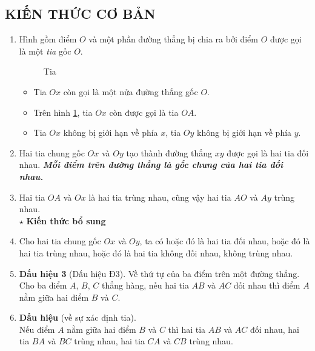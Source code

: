 \subsection{KIẾN THỨC CƠ BẢN}
\begin{enumerate}
	\item Hình gồm điểm $O$ và một phần đường thẳng bị chia ra bởi điểm $O$ được gọi là một \emph{tia} gốc $O$.
	\begin{figure}[h]
		\centering
		\caption{Tia}
		\label{01.thai.im1}
	\end{figure}
	
	\begin{itemize}
		\item Tia $Ox$ còn gọi là một nửa đường thẳng gốc $O$.
		\item Trên hình \ref{01.thai.im1}, tia $Ox$ còn được gọi là tia $OA$.
		\item Tia $Ox$ không bị giới hạn về phía $x$, tia $Oy$ không bị giới hạn về phía $y$.
	\end{itemize}
	\item Hai tia chung gốc $Ox$ và $Oy$ tạo thành đường thẳng $xy$ được gọi là hai tia đối nhau. \emph{\textbf{Mỗi điểm trên đường thẳng là gốc chung của hai tia đối nhau.}}
	\item Hai tia $OA$ và $Ox$ là hai tia trùng nhau, cũng vậy hai tia $AO$ và $Ay$ trùng nhau.\\
	$\star$ \textbf{Kiến thức bổ sung}
	\item Cho hai tia chung gốc $Ox$ và $Oy$, ta có hoặc đó là hai tia đối nhau, hoặc đó là hai tia trùng nhau, hoặc đó là hai tia không đối nhau, không trùng nhau.
	\item \textbf{Dấu hiệu 3} (Dấu hiệu Đ3). Về thứ tự của ba điểm trên một đường thẳng.\\
	Cho ba điểm $A$, $B$, $C$ thẳng hàng, nếu hai tia $AB$ và $AC$ đối nhau thì điểm $A$ nằm giữa hai điểm $B$ và $C$.
	\item \textbf{Dấu hiệu} (về sự xác định tia).\\
	Nếu điểm $A$ nằm giữa hai điểm $B$ và $C$ thì hai tia $AB$ và $AC$ đối nhau, hai tia $BA$ và $BC$ trùng nhau, hai tia $CA$ và $CB$ trùng nhau.
\end{enumerate}

